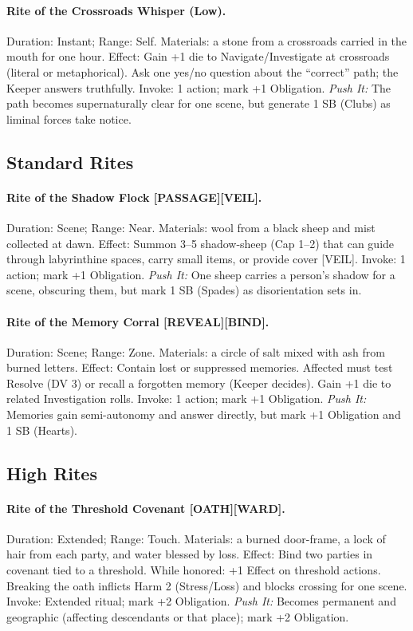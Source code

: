 \documentclass[11pt]{article}
\begin{document}
\paragraph{Rite of the Crossroads Whisper (Low).} Duration: Instant; Range: Self.  
Materials: a stone from a crossroads carried in the mouth for one hour.  
Effect: Gain +1 die to Navigate/Investigate at crossroads (literal or metaphorical). Ask one yes/no question about the ``correct'' path; the Keeper answers truthfully.  
Invoke: 1 action; mark +1 Obligation.  
\emph{Push It:} The path becomes supernaturally clear for one scene, but generate 1 SB (Clubs) as liminal forces take notice.

\subsection*{Standard Rites}
\paragraph{Rite of the Shadow Flock [PASSAGE][VEIL].} Duration: Scene; Range: Near.  
Materials: wool from a black sheep and mist collected at dawn.  
Effect: Summon 3--5 shadow-sheep (Cap 1--2) that can guide through labyrinthine spaces, carry small items, or provide cover [VEIL].  
Invoke: 1 action; mark +1 Obligation.  
\emph{Push It:} One sheep carries a person's shadow for a scene, obscuring them, but mark 1 SB (Spades) as disorientation sets in.

\paragraph{Rite of the Memory Corral [REVEAL][BIND].} Duration: Scene; Range: Zone.  
Materials: a circle of salt mixed with ash from burned letters.  
Effect: Contain lost or suppressed memories. Affected must test Resolve (DV 3) or recall a forgotten memory (Keeper decides). Gain +1 die to related Investigation rolls.  
Invoke: 1 action; mark +1 Obligation.  
\emph{Push It:} Memories gain semi-autonomy and answer directly, but mark +1 Obligation and 1 SB (Hearts).

\subsection*{High Rites}
\paragraph{Rite of the Threshold Covenant [OATH][WARD].} Duration: Extended; Range: Touch.  
Materials: a burned door-frame, a lock of hair from each party, and water blessed by loss.  
Effect: Bind two parties in covenant tied to a threshold. While honored: +1 Effect on threshold actions. Breaking the oath inflicts Harm 2 (Stress/Loss) and blocks crossing for one scene.  
Invoke: Extended ritual; mark +2 Obligation.  
\emph{Push It:} Becomes permanent and geographic (affecting descendants or that place); mark +2 Obligation.  
\end{document}
